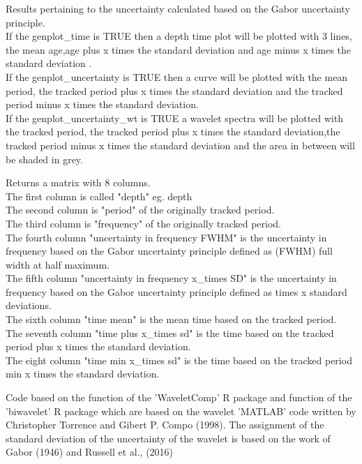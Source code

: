 \documentclass[a4paper]{book}
\begin{document}
\begin{Value}
Results pertaining to the uncertainty calculated based on the Gabor uncertainty principle.\\{}
If the genplot\_time is TRUE then a depth time plot will be plotted with 3 lines, the mean age,age plus
x times the standard deviation and age minus x times the standard deviation . \\{}
If the genplot\_uncertainty is TRUE then a curve will be plotted with the mean period, the tracked period plus
x times the standard deviation and the tracked period minus x times the standard deviation. \\{}
If the genplot\_uncertainty\_wt is TRUE a wavelet spectra will be plotted with the tracked period, the tracked period plus
x times the standard deviation,the tracked period minus x times the standard deviation and the area in between will be shaded in grey.\\{}

Returns a matrix with 8 columns.\\{}
The first column is called "depth" eg. depth \\{}
The second column is "period" of the originally tracked period. \\{}
The third column is "frequency" of the originally tracked period. \\{}
The fourth column "uncertainty in frequency FWHM" is the uncertainty in frequency based on the Gabor uncertainty principle defined as
(FWHM) full width at half maximum. \\{}
The fifth column "uncertainty in frequency x\_times SD" is the uncertainty in frequency based on the Gabor uncertainty principle defined as
times x standard deviations. \\{}
The sixth column "time mean" is the mean time based on the tracked period. \\{}
The seventh column "time plus x\_times sd" is the time based on the tracked period plus x times the standard deviation. \\{}
The eight column "time min x\_times sd" is the time based on the tracked period min x times the standard deviation. \\{}
\end{Value}
%
\begin{Author}
Code based on the  function of the 'WaveletComp' R package
and  function of the 'biwavelet' R package which are based on the
wavelet 'MATLAB' code written by Christopher Torrence and Gibert P. Compo (1998).
The assignment of the standard deviation of the uncertainty of the wavelet
is based on the work of Gabor (1946) and Russell et al., (2016)
\end{Author}
\end{document}
